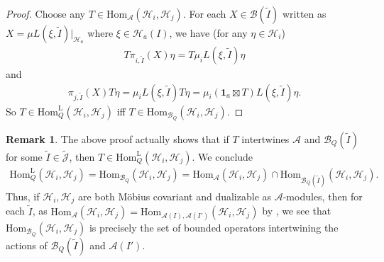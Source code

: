 \documentclass[11pt,b5paper,notitlepage]{article}
\theoremstyle{definition}
\newtheorem{rem}[df]{Remark}
\theoremstyle{plain}
\newcommand{\mc}{\mathcal}
\newcommand{\wtd}{\widetilde}
\newcommand{\id}{\mathbf{1}}
\newcommand{\Hom}{\mathrm{Hom}}
\newcommand{\Jtd}{\widetilde{\mathcal J}}
\newcommand{\HomL}{\mathrm{Hom}^{\mathrm{L}}}
\numberwithin{equation}{section}
\begin{document}
\begin{proof}
Choose any $T\in\Hom_{\mc A}(\mc H_i,\mc H_j)$. For each $X\in\mc B(\wtd I)$ written as $X=\mu L(\xi,\wtd I)|_{\mc H_a}$ where $\xi\in\mc H_a(I)$, we have (for any $\eta\in\mc H_i$)
\begin{align*}
T\pi_{i,\wtd I}(X)\eta=T\mu_i L(\xi,\wtd I)\eta	
\end{align*}
and
\begin{align*}
\pi_{j,\wtd I}(X)T\eta=\mu_i L(\xi,\wtd I)T\eta=\mu_i(\id_a\boxtimes T)L(\xi,\wtd I)\eta.
\end{align*}
So $T\in\HomL_Q(\mc H_i,\mc H_j)$ iff $T\in\Hom_{\mc B_Q}(\mc H_i,\mc H_j)$.
\end{proof}


\begin{rem}
The above proof actually shows that if $T$ intertwines $\mc A$ and $\mc B_Q(\wtd I)$ for some $\wtd I\in\Jtd$, then $T\in\HomL_Q(\mc H_i,\mc H_j)$. We conclude
\begin{align}
\HomL_Q(\mc H_i,\mc H_j)=\Hom_{\mc B_Q}(\mc H_i,\mc H_j)=\Hom_{\mc A}(\mc H_i,\mc H_j)\cap \Hom_{\mc B_Q(\wtd I)}(\mc H_i,\mc H_j).
\end{align}
Thus, if $\mc H_i,\mc H_j$ are both M\"obius covariant and dualizable as $\mc A$-modules, then for each $\wtd I$, as $\Hom_{\mc A}(\mc H_i,\mc H_j)=\Hom_{\mc A(I),\mc A(I')}(\mc H_i,\mc H_j)$ by \cite[Thm. 2.3]{GL96}, we see that $\Hom_{\mc B_Q}(\mc H_i,\mc H_j)$ is precisely the set of bounded operators intertwining the actions of $\mc B_Q(\wtd I)$ and $\mc A(I')$.
\end{rem}
\end{document}
